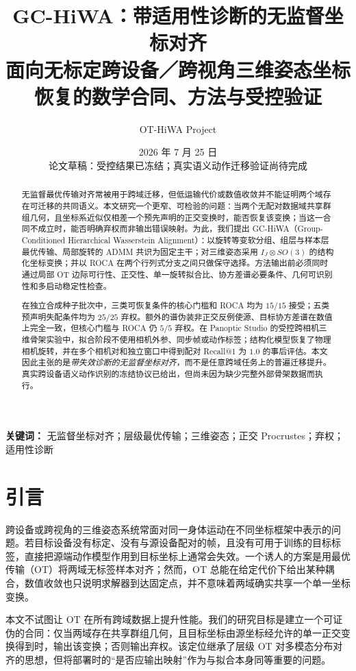 \documentclass[UTF8,a4paper,11pt]{ctexart}
\title{\textbf{GC-HiWA：带适用性诊断的无监督坐标对齐}\\
\large 面向无标定跨设备／跨视角三维姿态坐标恢复的数学合同、方法与受控验证}
\author{OT-HiWA Project}
\date{2026 年 7 月 25 日\\\small 论文草稿：受控结果已冻结；真实语义动作迁移验证尚待完成}
\theoremstyle{definition}
\theoremstyle{remark}
\begin{document}
\maketitle

\begin{abstract}
无监督最优传输对齐常被用于跨域迁移，但低运输代价或数值收敛并不能证明两个域存在可迁移的共同语义。本文研究一个更窄、可检验的问题：当两个无配对数据域共享群组几何，且坐标系近似仅相差一个预先声明的正交变换时，能否恢复该变换；当这一合同不成立时，能否明确弃权而非输出错误映射。为此，我们提出 GC-HiWA（Group-Conditioned Hierarchical Wasserstein Alignment）：以旋转等变软分组、组层与样本层最优传输、局部旋转的 ADMM 共识为固定主干；对三维姿态采用 $I_J\otimes SO(3)$ 的结构化坐标变换；并以 ROCA 在两个行列式分支之间只做保守选择。方法输出前必须同时通过局部 OT 边际可行性、正交性、单一旋转拟合比、协方差谱必要条件、几何可识别性和多启动稳定性检查。

在独立合成种子批次中，三类可恢复条件的核心门槛和 ROCA 均为 $15/15$ 接受；五类预声明失配条件均为 $25/25$ 弃权。额外的谱伪装非正交反例使源、目标协方差谱在数值上完全一致，但核心门槛与 ROCA 仍 $5/5$ 弃权。在 Panoptic Studio 的受控跨相机三维骨架实验中，拟合阶段不使用相机外参、同步帧或动作标签；结构化模型恢复了物理相机旋转，并在多个相机对和独立窗口中得到配对 Recall@1 为 $1.0$ 的事后评估。本文因此主张的是\emph{带失效诊断的无监督坐标对齐}，而不是任意跨域任务上的普遍迁移提升。真实跨设备语义动作识别的冻结协议已给出，但尚未因为缺少完整外部骨架数据而执行。
\end{abstract}

\noindent\textbf{关键词：} 无监督坐标对齐；层级最优传输；三维姿态；正交 Procrustes；弃权；适用性诊断

\section{引言}
跨设备或跨视角的三维姿态系统常面对同一身体运动在不同坐标框架中表示的问题。若目标设备没有标定、没有与源设备配对的帧，且没有可用于训练的目标标签，直接把源端动作模型作用到目标坐标上通常会失效。一个诱人的方案是用最优传输（OT）将两域无标签样本对齐；然而，OT 总能在给定代价下给出某种耦合，数值收敛也只说明求解器到达固定点，并不意味着两域确实共享一个单一坐标变换。

本文不试图让 OT 在所有跨域数据上提升性能。我们的研究目标是建立一个可证伪的合同：仅当两域存在共享群组几何，且目标坐标由源坐标经允许的单一正交变换得到时，输出该变换；否则输出弃权。该定位继承了层级 OT 对多模态分布对齐的思想\cite{lee2019hierarchical,peyre2019computational}，但将部署时的“是否应输出映射”作为与拟合本身同等重要的问题。
\end{document}
